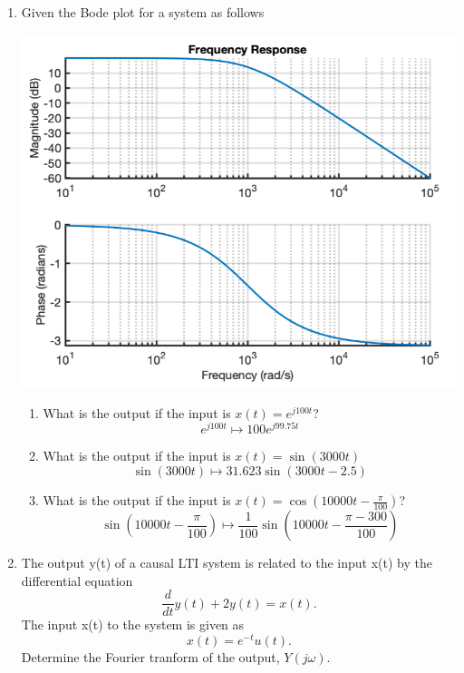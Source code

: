 \documentclass{article}
\begin{document}
\begin{enumerate}
    \item Given the Bode plot for a system as follows
    \begin{center}
        \includegraphics[width = .65\textwidth]{bode.png}
    \end{center}
    \begin{enumerate}
        \item What is the output if the input is $x(t) = e^{j100t}$?
        \begin{equation}
            e^{j100t} \mapsto 100e^{j99.75t}
        \end{equation}
        \item What is the output if the input is $x(t) = \sin(3000t)$
        \begin{equation}
            \sin(3000t) \mapsto 31.623\sin(3000t-2.5)
        \end{equation}
        \item What is the output if the input is $x(t) = \cos(10000t - \frac{\pi}{100})$?
        \begin{equation}
            \sin(10000t - \frac{\pi}{100}) \mapsto \frac{1}{100}\sin(10000t- \frac{\pi-300}{100})
        \end{equation}
    \end{enumerate}
    \newpage
    \item The output y(t) of a causal LTI system is related to the input x(t) by the differential equation   
    \begin{equation}
        \frac{d}{dt}y(t) + 2y(t) = x(t).
    \end{equation}
    The input x(t) to the system is given as
    \begin{equation}
        x(t) = e^{-t}u(t).
    \end{equation}
    Determine the Fourier tranform of the output, $Y(j\omega)$.
    \begin{equation}

\end{equation}
\end{enumerate}
\end{document}
